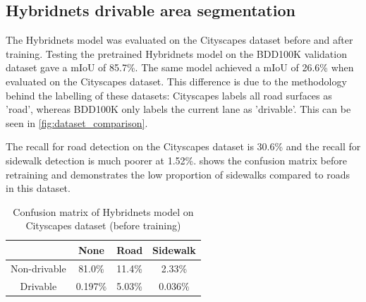 \pagebreak
\subsection{Hybridnets drivable area segmentation}
The Hybridnets model was evaluated on the Cityscapes dataset before and after training.
Testing the pretrained Hybridnets model on the BDD100K validation dataset gave a mIoU
of 85.7\%. The same model achieved a mIoU of 26.6\% when evaluated on the Cityscapes dataset.
This difference is due to the methodology behind
the labelling of these datasets: Cityscapes labels all road surfaces as 'road',
whereas BDD100K only labels the current lane as 'drivable'. This can be seen in \cref{fig:dataset_comparison}.

The recall for road detection on the Cityscapes dataset is 30.6\% and the recall for
sidewalk detection is much poorer at 1.52\%.  shows
the confusion matrix before retraining and demonstrates
the low proportion of sidewalks compared to roads in this dataset.

\begin{table}[H]
    \centering
    \begin{tabular}{|c|c|c|c|}
    \hline
    & None & Road & Sidewalk \\
    \hline
    Non-drivable & 81.0\% & 11.4\% & 2.33\% \\
    \hline
    Drivable & 0.197\% & 5.03\% & 0.036\% \\
    \hline
    \end{tabular}
    \caption{Confusion matrix of Hybridnets model on Cityscapes dataset (before training)}
    \label{table:pretrained_confusion_matrix}
\end{table}

